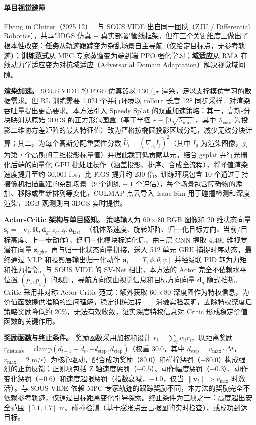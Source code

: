 \paragraph{单目视觉避障}

Flying in Clutter（2025.12）~\cite{2512_17349} 与 SOUS VIDE 出自同一团队（ZJU / Differential Robotics），共享"3DGS 仿真 + 真实部署"管线框架，但在三个关键维度上做出了根本性改变：\textbf{任务}从轨迹跟踪变为杂乱场景自主导航（仅给定目标点，无参考轨迹）；\textbf{训练范式}从 MPC 专家蒸馏变为端到端 PPO 强化学习；\textbf{域适应}从 RMA 在线动力学适应变为对抗域适应（Adversarial Domain Adaptation）解决视觉域间隙。

\textbf{渲染加速。}
SOUS VIDE 的 FiGS 仿真器以 130 fps 渲染，足以支撑模仿学习的数据需求。但 RL 训练需要 1,024 个并行环境以 rollout 长度 128 同步采样，对渲染吞吐量提出更高要求。本方法引入 Speedy Splat 的双重加速策略：其一，高斯-分块映射从原始 3DGS 的正方形包围盒（基于半径 $r = \lceil 3\sqrt{\lambda_{\max}} \rceil$，其中 $\lambda_{\max}$ 为投影二维协方差矩阵的最大特征值）改为严格按椭圆投影区域分配，减少无效分块计算；其二，为每个高斯分配重要性分数 $\tilde{U}_i = (\nabla_{g_i} I_g)^2$（其中 $I_g$ 为渲染图像，$g_i$ 为第 $i$ 个高斯的二维投影标量值）并据此裁剪低贡献基元。结合 gsplat 并行光栅化后端的向量化 GPU 批处理操作（涵盖投影、排序、合成全流程），将峰值渲染速度提升至约 30,000 fps，比 FiGS 提升约 230 倍。训练环境包含 10 个通过手持摄像机扫描重建的杂乱场景（9 个训练 + 1 个评估），每个场景包含障碍物的添加、移除或重新排列等变化，COLMAP 点云导入 Isaac Sim 用于碰撞检测和深度渲染，RGB 观测则由 3DGS 实时提供。

\textbf{Actor-Critic 架构与单目感知。}
策略输入为 $60 \times 80$ RGB 图像和 20 维状态向量 $\bm{s}_t = [\bm{v}_b, \bm{R}, \bm{d}_g, z_c, z_t, \bm{a}_{\text{last}}]$（机体系速度、旋转矩阵、归一化目标方向、当前/目标高度、上一步动作），经归一化模块标准化后，由三层 CNN 提取 4,480 维视觉潜在向量 $\bm{z}_{rgb}$，再与归一化状态向量拼接，送入 512 单元 GRU 捕捉时序动态，最终通过 MLP 和投影层输出归一化动作 $\bm{a}_t = [T, \phi, \theta, \psi]$ 并经级联 PID 转为力矩和推力指令。与 SOUS VIDE 的 SV-Net 相比，本方法的 Actor 完全不依赖水平位置 $(p_x, p_y)$ 的观测，导航方向仅由视觉信息和目标方向向量 $\bm{d}_g$ 隐式推断。Critic 采用非对称 Actor-Critic 范式：额外获取 $60 \times 80$ 深度图作为特权信息，为价值函数提供准确的空间理解，稳定训练过程——消融实验表明，去除特权深度后策略奖励降低约 20\%，无法有效收敛，证实深度特权信息对 Critic 形成稳定价值函数的关键作用。

\textbf{奖励函数与终止条件。}
奖励函数采用加权和设计 $r_t = \sum_i w_i r_i$，以距离奖励 $r_{\text{distance}} = \text{clamp}(d_{t-1} - d_t, -d_{\text{step}}, d_{\text{step}})$（权重 30.0，其中 $d_{\text{step}} = v_{\max} \cdot \Delta t$，$v_{\max} = 2$ m/s）为核心驱动，配合成功奖励（80.0）和碰撞惩罚（$-80.0$）构成强烈的正负反馈；正则项包括 Z 轴速度惩罚（$-0.5$）、动作幅度惩罚（$-0.3$）、动作变化惩罚（$-0.6$）和速度超限惩罚（指数衰减，$-1.0$，仅当 $\|\bm{v}_t\| > v_{\max}$ 时激活）。与 SOUS VIDE 依赖 MPC 专家轨迹的跟踪奖励不同，本方法的奖励完全不依赖参考轨迹，仅通过目标距离变化引导探索。终止条件为三项之一：高度超出安全范围 $[0.1, 1.7]$ m、碰撞检测（基于膨胀点云占据图的实时检查）、或成功到达目标。

